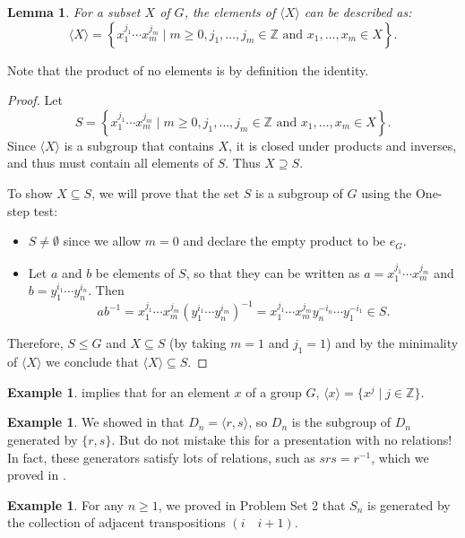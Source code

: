 \documentclass[12pt]{report}
\newtheorem{lemma}[theorem]{Lemma}
\numberwithin{equation}{section}
\numberwithin{theorem}{chapter}
\theoremstyle{definition}
\newtheorem{example}[theorem]{Example}
\newtheorem*{basic properties}{Basic Properties}
\newtheorem*{Important Remark}{Important Remark}
\newcommand{\Z}{\mathbb{Z}}
\begin{document}
\begin{lemma}\label{lem:<X>}
For a subset $X$ of $G$, the elements of $\langle X \rangle$ can be described as:
$$\langle X \rangle = \left\{x_1^{j_1} \cdots x_m^{j_m} \mid m \geqslant 0, j_1, \dots, j_m \in \Z \text{ and }x_1, \dots, x_m \in X \right\}.$$
\end{lemma}

Note that the product of no elements is by definition the identity.

\begin{proof} 
Let 
$$S= \left\{x_1^{j_1} \cdots x_m^{j_m} \mid m \geqslant 0, j_1, \dots, j_m \in \Z \text{ and }x_1, \dots, x_m \in X \right\}.$$ 
Since $\langle X \rangle$ is a subgroup that contains $X$, it is closed under products and inverses, and thus must contain all elements of $S$. Thus $X \supseteq S$.

To show $X \subseteq S$, we will prove that the set $S$ is a subgroup of $G$ using the One-step test:
\begin{itemize}
\item $S \neq \emptyset$ since we allow $m = 0$ and
declare the empty product to be $e_G$. 
\item Let $a$ and $b$ be elements of $S$, so that they can be written as
$a = x_1^{j_1} \cdots x_m^{j_m}$ and $b= y_1^{i_1} \cdots y_n^{i_n}$. Then
$$
ab^{-1} = x_1^{j_1} \cdots x_m^{j_m}(y_1^{i_1} \cdots y_n^{i_m})^{-1}=
x_1^{j_1} \cdots x_m^{j_m} y_n^{-i_n} \cdots y_1^{-i_1} \in S.
$$
\end{itemize}
Therefore, $S\leq G$ and $X\subseteq S$ (by taking $m=1$ and $j_1=1$) and by the minimality of $\langle X \rangle$ we conclude that $\langle X \rangle\subseteq S$. 
\end{proof}

 
 \begin{example} 
 implies that for an element $x$ of a group $G$, $\langle x\rangle=\{x^j \mid j\in \Z\}$.
\end{example}

\begin{example} 
We showed in  that $D_{n}=\langle r,s \rangle$, so $D_{n}$ is the subgroup of $D_{n}$ generated by $\{r,s\}$. But do not mistake this for a presentation with no relations! In fact, these generators satisfy lots of relations, such as $srs=r^{-1}$, which we proved in .
\end{example}

\begin{example} 
For any $n \geqslant 1$, we proved in Problem Set 2 that $S_n$ is generated by the collection of adjacent transpositions $(i \quad i+1)$.	
\end{example}
\end{document}

